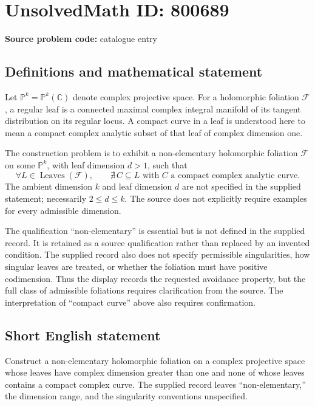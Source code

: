 \documentclass[11pt]{article}
\newcommand{\C}{\mathbb{C}}
\begin{document}
\section*{UnsolvedMath ID: 800689}
\textbf{Source problem code:} catalogue entry
\subsection{Definitions and mathematical statement}
Let \(\mathbb{P}^{k}=\mathbb{P}^{k}(\C)\) denote complex projective space. For a holomorphic foliation \(\mathscr{F}\), a regular leaf is a connected maximal complex integral manifold of its tangent distribution on its regular locus. A compact curve in a leaf is understood here to mean a compact complex analytic subset of that leaf of complex dimension one.

The construction problem is to exhibit a non-elementary holomorphic foliation \(\mathscr{F}\) on some \(\mathbb{P}^{k}\), with leaf dimension \(d>1\), such that
\[
\forall L\in\operatorname{Leaves}(\mathscr{F}),\qquad
\nexists\, C\subseteq L\text{ with }C\text{ a compact complex analytic curve}.
\]
The ambient dimension \(k\) and leaf dimension \(d\) are not specified in the supplied statement; necessarily \(2\leq d\leq k\). The source does not explicitly require examples for every admissible dimension.

The qualification ``non-elementary'' is essential but is not defined in the supplied record. It is retained as a source qualification rather than replaced by an invented condition. The supplied record also does not specify permissible singularities, how singular leaves are treated, or whether the foliation must have positive codimension. Thus the display records the requested avoidance property, but the full class of admissible foliations requires clarification from the source. The interpretation of ``compact curve'' above also requires confirmation.
\subsection{Short English statement}
Construct a non-elementary holomorphic foliation on a complex projective space whose leaves have complex dimension greater than one and none of whose leaves contains a compact complex curve. The supplied record leaves ``non-elementary,'' the dimension range, and the singularity conventions unspecified.
\end{document}
